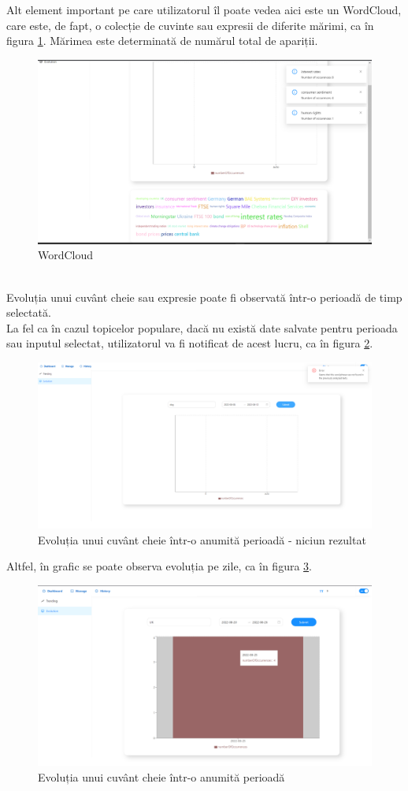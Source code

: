 \newpage
Alt element important pe care utilizatorul îl poate vedea aici este un WordCloud, care este, de fapt, o colecție de cuvinte sau expresii de diferite mărimi, ca în figura \ref{fig:wordcloud}. Mărimea este determinată de numărul total de apariții.
\begin{figure}[ht]
	\centering
	\includegraphics[width=150mm]{figs/wordcloud.png}
    \caption{WordCloud}
	\label{fig:wordcloud}
\end{figure}

\ \\
Evoluția unui cuvânt cheie sau expresie poate fi observată într-o perioadă de timp selectată.\\
La fel ca în cazul topicelor populare, dacă nu există date salvate pentru perioada sau inputul selectat, utilizatorul va fi notificat de acest lucru, ca în figura \ref{fig:evolutionNoData}. 
\begin{figure}[h]
	\centering
	\includegraphics[width=150mm]{figs/evolutionNoData.png}
    \caption{Evoluția unui cuvânt cheie într-o anumită perioadă - niciun rezultat}
	\label{fig:evolutionNoData}
\end{figure}

\newpage
Altfel, în grafic se poate observa evoluția pe zile, ca în figura \ref{fig:evolution}.
\begin{figure}[t]
	\centering
	\includegraphics[width=150mm]{figs/evolution.png}
    \caption{Evoluția unui cuvânt cheie într-o anumită perioadă}
	\label{fig:evolution}
\end{figure}